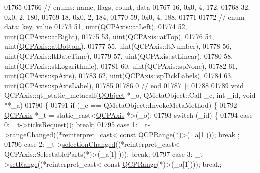 \begin{DoxyCode}
01765 
01766  \textcolor{comment}{// enums: name, flags, count, data}
01767       16, 0x0,    4,  172,
01768       32, 0x0,    2,  180,
01769       18, 0x0,    2,  184,
01770       59, 0x0,    4,  188,
01771 
01772  \textcolor{comment}{// enum data: key, value}
01773       51, uint(\hyperlink{a00025_ae2bcc1728b382f10f064612b368bc18aaf84aa6cac6fb6099f54a2cbf7546b730}{QCPAxis::atLeft}),
01774       52, uint(\hyperlink{a00025_ae2bcc1728b382f10f064612b368bc18aadf5509f7d29199ef2f263b1dd224b345}{QCPAxis::atRight}),
01775       53, uint(\hyperlink{a00025_ae2bcc1728b382f10f064612b368bc18aac0ece2b680d3f545e701f75af1655977}{QCPAxis::atTop}),
01776       54, uint(\hyperlink{a00025_ae2bcc1728b382f10f064612b368bc18aa220d68888516b6c3b493d144f1ba438f}{QCPAxis::atBottom}),
01777       55, uint(QCPAxis::ltNumber),
01778       56, uint(QCPAxis::ltDateTime),
01779       57, uint(QCPAxis::stLinear),
01780       58, uint(QCPAxis::stLogarithmic),
01781       60, uint(QCPAxis::spNone),
01782       61, uint(QCPAxis::spAxis),
01783       62, uint(QCPAxis::spTickLabels),
01784       63, uint(QCPAxis::spAxisLabel),
01785 
01786        0        \textcolor{comment}{// eod}
01787 \};
01788 
01789 \textcolor{keywordtype}{void} QCPAxis::qt\_static\_metacall(\hyperlink{a00059}{QObject} *\_o, QMetaObject::Call \_c, \textcolor{keywordtype}{int} \_id, \textcolor{keywordtype}{void} **\_a)
01790 \{
01791     \textcolor{keywordflow}{if} (\_c == QMetaObject::InvokeMetaMethod) \{
01792         \hyperlink{a00025}{QCPAxis} *\_t = \textcolor{keyword}{static\_cast<}\hyperlink{a00025}{QCPAxis} *\textcolor{keyword}{>}(\_o);
01793         \textcolor{keywordflow}{switch} (\_id) \{
01794         \textcolor{keywordflow}{case} 0: \_t->\hyperlink{a00025_af46d99613d29518795134ec4928e3873}{ticksRequest}(); \textcolor{keywordflow}{break};
01795         \textcolor{keywordflow}{case} 1: \_t->\hyperlink{a00025_a0894084e4c16a1736534c4095746f910}{rangeChanged}((*\textcolor{keyword}{reinterpret\_cast<} \textcolor{keyword}{const }\hyperlink{a00049}{QCPRange}(*)\textcolor{keyword}{>}(\_a[1]))); \textcolor{keywordflow}{break}
      ;
01796         \textcolor{keywordflow}{case} 2: \_t->\hyperlink{a00025_aece2d803d07dba9dc2ea96fcad186e34}{selectionChanged}((*\textcolor{keyword}{reinterpret\_cast<} QCPAxis::SelectableParts(*)\textcolor{keyword}{>}(\_a[1]
      ))); \textcolor{keywordflow}{break};
01797         \textcolor{keywordflow}{case} 3: \_t->\hyperlink{a00025_a57d6ee9e9009fe88cb19db476ec70bca}{setRange}((*\textcolor{keyword}{reinterpret\_cast<} \textcolor{keyword}{const }\hyperlink{a00049}{QCPRange}(*)\textcolor{keyword}{>}(\_a[1]))); \textcolor{keywordflow}{break};

\end{DoxyCode}
